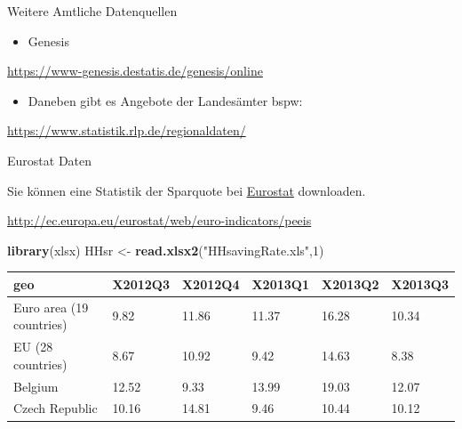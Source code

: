 \documentclass[ignorenonframetext,]{beamer}
\newenvironment{Shaded}{\begin{snugshade}}{\end{snugshade}}
\newcommand{\DecValTok}[1]{\textcolor[rgb]{0.00,0.00,0.81}{#1}}
\newcommand{\KeywordTok}[1]{\textcolor[rgb]{0.13,0.29,0.53}{\textbf{#1}}}
\newcommand{\NormalTok}[1]{#1}
\newcommand{\StringTok}[1]{\textcolor[rgb]{0.31,0.60,0.02}{#1}}
\providecommand{\tightlist}{%
  \setlength{\itemsep}{0pt}\setlength{\parskip}{0pt}}
\begin{document}
\begin{frame}{Weitere Amtliche Datenquellen}
\protect\hypertarget{weitere-amtliche-datenquellen}{}

\begin{itemize}
\tightlist
\item
  Genesis
\end{itemize}

\url{https://www-genesis.destatis.de/genesis/online}

\begin{itemize}
\tightlist
\item
  Daneben gibt es Angebote der Landesämter bspw:
\end{itemize}

\url{https://www.statistik.rlp.de/regionaldaten/}

\end{frame}

\begin{frame}[fragile]{Eurostat Daten}
\protect\hypertarget{eurostat-daten}{}

Sie können eine Statistik der Sparquote bei
\href{http://ec.europa.eu/eurostat/web/euro-indicators/peeis}{Eurostat}
downloaden.

\url{http://ec.europa.eu/eurostat/web/euro-indicators/peeis}

\begin{Shaded}
\begin{Highlighting}[]
\KeywordTok{library}\NormalTok{(xlsx)}
\NormalTok{HHsr <-}\StringTok{ }\KeywordTok{read.xlsx2}\NormalTok{(}\StringTok{"HHsavingRate.xls"}\NormalTok{,}\DecValTok{1}\NormalTok{)}
\end{Highlighting}
\end{Shaded}

\begin{longtable}[]{@{}llllll@{}}
\toprule
geo & X2012Q3 & X2012Q4 & X2013Q1 & X2013Q2 & X2013Q3\tabularnewline
\midrule
\endhead
Euro area (19 countries) & 9.82 & 11.86 & 11.37 & 16.28 &
10.34\tabularnewline
EU (28 countries) & 8.67 & 10.92 & 9.42 & 14.63 & 8.38\tabularnewline
Belgium & 12.52 & 9.33 & 13.99 & 19.03 & 12.07\tabularnewline
Czech Republic & 10.16 & 14.81 & 9.46 & 10.44 & 10.12\tabularnewline
\bottomrule
\end{longtable}

\end{frame}
\end{document}

